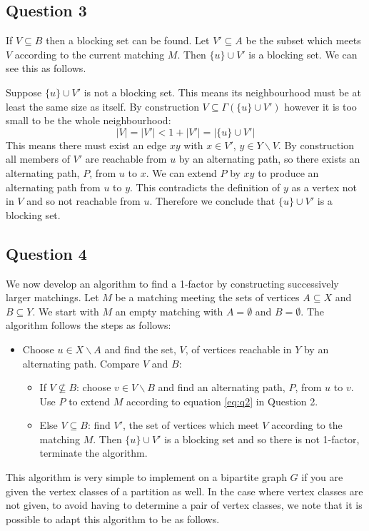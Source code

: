 \documentclass[a4paper]{article}
\begin{document}
\subsection*{Question 3}

If $V\subseteq B$ then a blocking set can be found. Let $V'\subseteq A$ be the subset which meets $V$ according to the current matching $M$. Then $\{ u\} \cup V'$ is a blocking set. We can see this as follows.

\bigskip
Suppose $\{ u\} \cup V'$ is not a blocking set. This means its neighbourhood must be at least the same size as itself. By construction $V\subseteq \Gamma(\{ u\} \cup V')$ however it is too small to be the whole neighbourhood:
\[ |V| = |V'| < 1 + |V'| = |\{ u\} \cup V'| \]
This means there must exist an edge $xy$ with $x\in V'$, $y\in Y\backslash V$. By construction all members of $V'$ are reachable from $u$ by an alternating path, so there exists an alternating path, $P$, from $u$ to $x$. We can extend $P$ by $xy$ to produce an alternating path from $u$ to $y$. This contradicts the definition of $y$ as a vertex not in $V$ and so not reachable from $u$. Therefore we conclude that $\{ u\} \cup V'$ is a blocking set.

\subsection*{Question 4}

We now develop an algorithm to find a 1-factor by constructing successively larger matchings. Let $M$ be a matching meeting the sets of vertices $A\subseteq X$ and $B\subseteq Y$. We start with $M$ an empty matching with $A=\emptyset$ and $B=\emptyset$. The algorithm follows the steps as follows:
 \renewcommand\labelitemii{\textbullet}
\begin{itemize}
    \item
    Choose $u\in X\backslash A$ and find the set, $V$, of vertices reachable in $Y$ by an alternating path. Compare $V$ and $B$:
    \begin{itemize}
        \item
        If $V\nsubseteq B$: choose $v \in V\backslash B$ and find an alternating path, $P$, from $u$ to $v$. Use $P$ to extend $M$ according to equation \ref{eq:q2} in Question 2.
        \item
        Else $V\subseteq B$: find $V'$, the set of vertices which meet $V$ according to the matching $M$. Then $\{ u\} \cup V'$ is a blocking set and so there is not 1-factor, terminate the algorithm.
    \end{itemize}
\end{itemize}
This algorithm is very simple to implement on a bipartite graph $G$ if you are given the vertex classes of a partition as well. In the case where vertex classes are not given, to avoid having to determine a pair of vertex classes, we note that it is possible to adapt this algorithm to be as follows.
\end{document}
